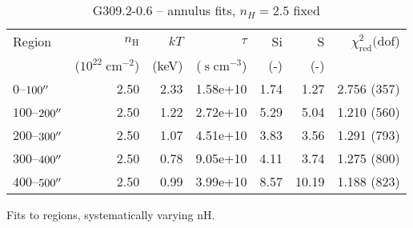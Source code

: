 \documentclass[preprint2,tighten,trackchanges]{aastex6}
\newcommand*{\mt}{\mathrm}
\newcommand*{\unit}[1]{\;\mt{#1}}  %
\begin{document}
\begin{table*}
    \centering
    \caption{G309.2-0.6 -- annulus fits, $n_H=2.5$ fixed}
    \begin{tabular}{@{}lrrrrrr@{}}
        \toprule
        Region & $n_\mathrm{H}$             & $kT$  & $\tau$                & Si  & S   & $\chi^2_{\mathrm{red}} (\mathrm{dof}$) \\
               & ($10^{22} \unit{cm^{-2}}$) & (keV) & ($\unit{s\;cm^{-3}}$) & (-) & (-) &  \\
        \midrule
        $0$--$100\mbox{$^{\prime\prime}$}$ & 2.50 & 2.33 & 1.58e+10 & 1.74 & 1.27 & 2.756 (357) \\  %
        $100$--$200\mbox{$^{\prime\prime}$}$ & 2.50 & 1.22 & 2.72e+10 & 5.29 & 5.04 & 1.210 (560) \\  %
        $200$--$300\mbox{$^{\prime\prime}$}$ & 2.50 & 1.07 & 4.51e+10 & 3.83 & 3.56 & 1.291 (793) \\  %
        $300$--$400\mbox{$^{\prime\prime}$}$ & 2.50 & 0.78 & 9.05e+10 & 4.11 & 3.74 & 1.275 (800) \\  %
        $400$--$500\mbox{$^{\prime\prime}$}$ & 2.50 & 0.99 & 3.99e+10 & 8.57 & 10.19 & 1.188 (823) \\  %
        \bottomrule
    \end{tabular}
\end{table*}

Fits to regions, systematically varying nH.
\end{document}
